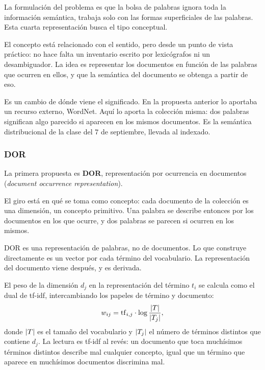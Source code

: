 \documentclass[11pt,letterpaper]{article}
\begin{document}
La formulación del problema es que la bolsa de palabras ignora toda
la información semántica, trabaja solo con las formas superficiales
de las palabras. Esta cuarta representación busca el tipo conceptual.

El concepto está relacionado con el sentido, pero desde un punto de
vista práctico: no hace falta un inventario escrito por
lexicógrafos ni un desambiguador. La idea es representar los
documentos en función de las palabras que ocurren en ellos, y que la
semántica del documento se obtenga a partir de eso.

\begin{idea}
    Es un cambio de dónde viene el significado. En la propuesta
    anterior lo aportaba un recurso externo, WordNet. Aquí lo aporta
    la colección misma: dos palabras significan algo parecido si
    aparecen en los mismos documentos. Es la semántica distribucional
    de la clase del $7$ de septiembre, llevada al indexado.
\end{idea}

\subsubsection*{DOR}

La primera propuesta es \textbf{DOR}, representación por ocurrencia
en documentos (\textit{document occurrence representation}).

El giro está en qué se toma como concepto: cada documento de la
colección es una dimensión, un concepto primitivo. Una palabra se
describe entonces por los documentos en los que ocurre, y dos
palabras se parecen si ocurren en los mismos.

\begin{ojo}
    DOR es una representación de palabras, no de documentos. Lo que
    construye directamente es un vector por cada término del
    vocabulario. La representación del documento viene después, y es
    derivada.
\end{ojo}

El peso de la dimensión $d_j$ en la representación del término $t_i$
se calcula como el dual de tf-idf, intercambiando los papeles de
término y documento:
\[
    w_{ij} = \mathrm{tf}_{i,j} \cdot \log \frac{\left\lvert T \right\rvert}{\left\lvert T_j \right\rvert} ,
\]
donde $\left\lvert T \right\rvert$ es el tamaño del vocabulario y $\left\lvert T_j \right\rvert$ el número
de términos distintos que contiene $d_j$. La lectura es tf-idf al
revés: un documento que toca muchísimos términos distintos describe
mal cualquier concepto, igual que un término que aparece en
muchísimos documentos discrimina mal.
\end{document}

